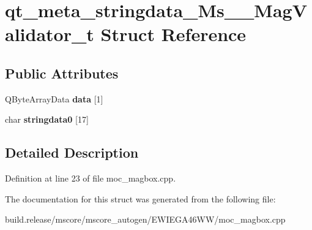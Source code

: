 \hypertarget{structqt__meta__stringdata___ms_____mag_validator__t}{}\section{qt\+\_\+meta\+\_\+stringdata\+\_\+\+Ms\+\_\+\+\_\+\+Mag\+Validator\+\_\+t Struct Reference}
\label{structqt__meta__stringdata___ms_____mag_validator__t}
\subsection*{Public Attributes}
\begin{DoxyCompactItemize}
\item 
\mbox{\label{structqt__meta__stringdata___ms_____mag_validator__t_a48102cf3a0e92df1b6af2085195994dd}} 
Q\+Byte\+Array\+Data {\bfseries data} \mbox{[}1\mbox{]}
\item 
\mbox{\label{structqt__meta__stringdata___ms_____mag_validator__t_a732a71a0469c7391be24de548fe64171}} 
char {\bfseries stringdata0} \mbox{[}17\mbox{]}
\end{DoxyCompactItemize}


\subsection{Detailed Description}


Definition at line 23 of file moc\+\_\+magbox.\+cpp.



The documentation for this struct was generated from the following file\+:\begin{DoxyCompactItemize}
\item 
build.\+release/mscore/mscore\+\_\+autogen/\+E\+W\+I\+E\+G\+A46\+W\+W/moc\+\_\+magbox.\+cpp\end{DoxyCompactItemize}
